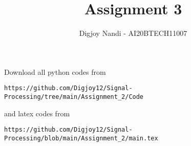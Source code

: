 \documentclass[journal,12pt,twocolumn]{IEEEtran}
\DeclareMathOperator*{\Res}{Res}
\begin{document}
\newcommand{\BEQA}{\begin{eqnarray}}
\newcommand{\EEQA}{\end{eqnarray}}
\newcommand{\define}{\stackrel{\triangle}{=}}

\raggedbottom
\setlength{\parindent}{0pt}
\providecommand{\mbf}{\mathbf}
\providecommand{\pr}[1]{\ensuremath{\Pr\left(#1\right)}}
\providecommand{\qfunc}[1]{\ensuremath{Q\left(#1\right)}}
\providecommand{\sbrak}[1]{\ensuremath{{}\left[#1\right]}}
\providecommand{\lsbrak}[1]{\ensuremath{{}\left[#1\right.}}
\providecommand{\rsbrak}[1]{\ensuremath{{}\left.#1\right]}}
\providecommand{\brak}[1]{\ensuremath{\left(#1\right)}}
\providecommand{\lbrak}[1]{\ensuremath{\left(#1\right.}}
\providecommand{\rbrak}[1]{\ensuremath{\left.#1\right)}}
\providecommand{\cbrak}[1]{\ensuremath{\left\{#1\right\}}}
\providecommand{\lcbrak}[1]{\ensuremath{\left\{#1\right.}}
\providecommand{\rcbrak}[1]{\ensuremath{\left.#1\right\}}}
\theoremstyle{remark}
\newtheorem{rem}{Remark}
\newcommand{\sgn}{\mathop{\mathrm{sgn}}}
\providecommand{\abs}[1]{\vert#1\vert}
\providecommand{\res}[1]{\Res\displaylimits_{#1}} 
\providecommand{\norm}[1]{\lVert#1\rVert}
\providecommand{\mtx}[1]{\mathbf{#1}}
\providecommand{\mean}[1]{E[ #1 ]}
\providecommand{\fourier}{\overset{\mathcal{F}}{ \rightleftharpoons}}
\providecommand{\system}{\overset{\mathcal{H}}{ \longleftrightarrow}}
\newcommand{\solution}{\noindent \textbf{Solution: }}
\newcommand{\cosec}{\,\text{cosec}\,}
\providecommand{\dec}[2]{\ensuremath{\overset{#1}{\underset{#2}{\gtrless}}}}
\newcommand{\myvec}[1]{\ensuremath{\begin{pmatrix}#1\end{pmatrix}}}
\newcommand{\mydet}[1]{\ensuremath{\begin{vmatrix}#1\end{vmatrix}}}
\makeatletter
{}
\makeatother
\let\StandardTheFigure\thefigure
\let\vec\mathbf
\renewcommand{\thefigure}{\theproblem}
\def\putbox#1#2#3{\makebox[0in][l]{\makebox[#1][l]{}\raisebox{\baselineskip}[0in][0in]{\raisebox{#2}[0in][0in]{#3}}}}
     \def\rightbox#1{\makebox[0in][r]{#1}}
     \def\centbox#1{\makebox[0in]{#1}}
     \def\topbox#1{\raisebox{-\baselineskip}[0in][0in]{#1}}
     \def\midbox#1{\raisebox{-0.5\baselineskip}[0in][0in]{#1}}
\vspace{3cm}
\title{Assignment 3}
\author{Digjoy Nandi - AI20BTECH11007}
\maketitle
\newpage
\bigskip
\renewcommand{\thefigure}{\theenumi}
\renewcommand{\thetable}{\theenumi}
Download all python codes from 
\begin{lstlisting}
https://github.com/Digjoy12/Signal-Processing/tree/main/Assignment_2/Code
\end{lstlisting}
%
and latex codes from 
%
\begin{lstlisting}
https://github.com/Digjoy12/Signal-Processing/blob/main/Assignment_2/main.tex
\end{lstlisting}
\end{document}
